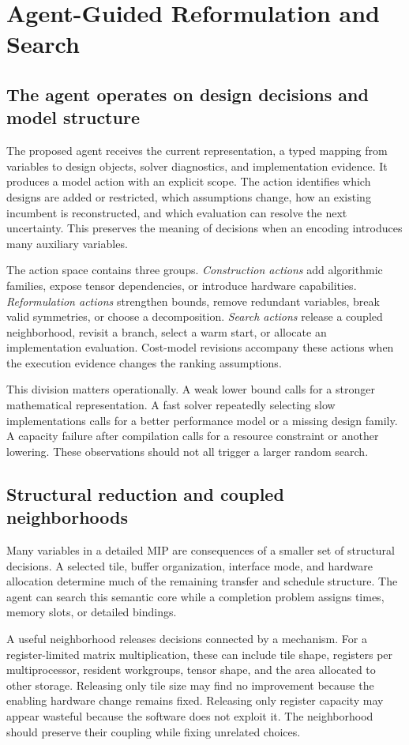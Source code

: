 \section{Agent-Guided Reformulation and Search}\label{sec:search}
\subsection{The agent operates on design decisions and model structure}
The proposed agent receives the current representation, a typed mapping from variables to design objects, solver diagnostics, and implementation evidence. It produces a model action with an explicit scope. The action identifies which designs are added or restricted, which assumptions change, how an existing incumbent is reconstructed, and which evaluation can resolve the next uncertainty. This preserves the meaning of decisions when an encoding introduces many auxiliary variables.

The action space contains three groups. \emph{Construction actions} add algorithmic families, expose tensor dependencies, or introduce hardware capabilities. \emph{Reformulation actions} strengthen bounds, remove redundant variables, break valid symmetries, or choose a decomposition. \emph{Search actions} release a coupled neighborhood, revisit a branch, select a warm start, or allocate an implementation evaluation. Cost-model revisions accompany these actions when the execution evidence changes the ranking assumptions.

This division matters operationally. A weak lower bound calls for a stronger mathematical representation. A fast solver repeatedly selecting slow implementations calls for a better performance model or a missing design family. A capacity failure after compilation calls for a resource constraint or another lowering. These observations should not all trigger a larger random search.

\subsection{Structural reduction and coupled neighborhoods}
Many variables in a detailed MIP are consequences of a smaller set of structural decisions. A selected tile, buffer organization, interface mode, and hardware allocation determine much of the remaining transfer and schedule structure. The agent can search this semantic core while a completion problem assigns times, memory slots, or detailed bindings.

A useful neighborhood releases decisions connected by a mechanism. For a register-limited matrix multiplication, these can include tile shape, registers per multiprocessor, resident workgroups, tensor shape, and the area allocated to other storage. Releasing only tile size may find no improvement because the enabling hardware change remains fixed. Releasing only register capacity may appear wasteful because the software does not exploit it. The neighborhood should preserve their coupling while fixing unrelated choices.

